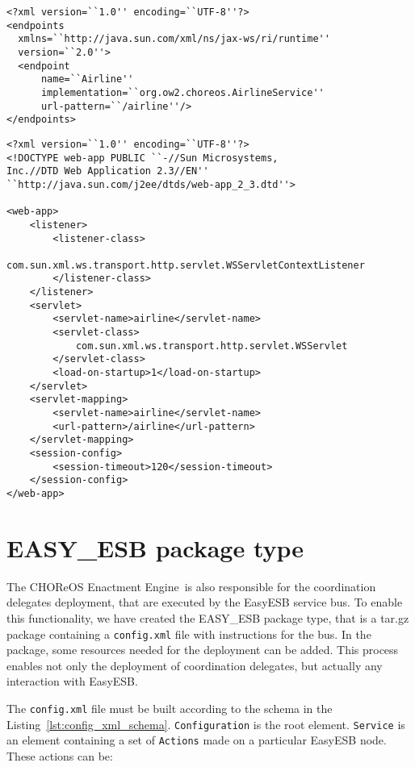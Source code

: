 \documentclass[a4paper, 10pt]{article}
\newcommand{\ee}{CHOReOS Enactment Engine}
\begin{document}
{\footnotesize
\begin{lstlisting}[caption=Example of \texttt{sun-jaxws.xml} file, label=lst:sun_jaxws_xml]
<?xml version=``1.0'' encoding=``UTF-8''?>
<endpoints
  xmlns=``http://java.sun.com/xml/ns/jax-ws/ri/runtime''
  version=``2.0''>
  <endpoint
      name=``Airline''
      implementation=``org.ow2.choreos.AirlineService''
      url-pattern=``/airline''/>
</endpoints>
\end{lstlisting}
}

{\footnotesize
\begin{lstlisting}[caption=Example of \texttt{web.xml} file, label=lst:web_xml]
<?xml version=``1.0'' encoding=``UTF-8''?>
<!DOCTYPE web-app PUBLIC ``-//Sun Microsystems, 
Inc.//DTD Web Application 2.3//EN''
``http://java.sun.com/j2ee/dtds/web-app_2_3.dtd''>
 
<web-app>
    <listener>
        <listener-class>
                com.sun.xml.ws.transport.http.servlet.WSServletContextListener
        </listener-class>
    </listener>
    <servlet>
        <servlet-name>airline</servlet-name>
        <servlet-class>
        	com.sun.xml.ws.transport.http.servlet.WSServlet
        </servlet-class>
        <load-on-startup>1</load-on-startup>
    </servlet>
    <servlet-mapping>
        <servlet-name>airline</servlet-name>
        <url-pattern>/airline</url-pattern>
    </servlet-mapping>
    <session-config>
        <session-timeout>120</session-timeout>
    </session-config>
</web-app>
\end{lstlisting}
}

\section{EASY\_ESB package type}

The \ee\ is also responsible for the coordination delegates deployment, that are executed by the EasyESB service bus. To enable this functionality, we have created the EASY\_ESB package type, that is a tar.gz package containing a \texttt{config.xml} file with instructions for the bus. In the package, some resources needed for the deployment can be added. This process enables not only the deployment of coordination delegates, but actually any interaction with EasyESB.

The \texttt{config.xml} file must be built according to the schema in the Listing~\ref{lst:config_xml_schema}. \texttt{Configuration} is the root element. \texttt{Service} is an element containing a set of \texttt{Actions} made on a particular EasyESB node. These actions can be:
\end{document}
